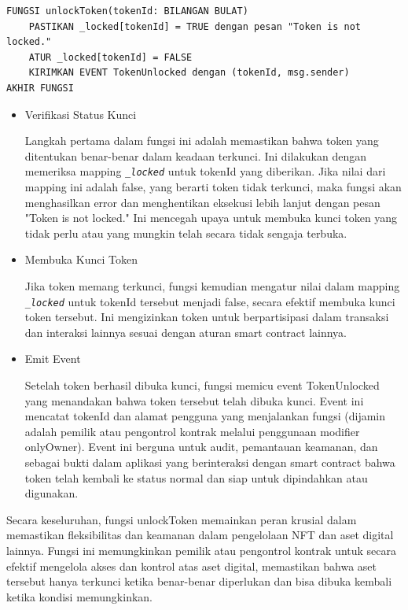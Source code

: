 \begin{lstlisting}[caption=Fungsi unlockToken]
FUNGSI unlockToken(tokenId: BILANGAN BULAT)
    PASTIKAN _locked[tokenId] = TRUE dengan pesan "Token is not locked."
    ATUR _locked[tokenId] = FALSE
    KIRIMKAN EVENT TokenUnlocked dengan (tokenId, msg.sender)
AKHIR FUNGSI
\end{lstlisting}

\begin{itemize}
    \item Verifikasi Status Kunci
    
    Langkah pertama dalam fungsi ini adalah memastikan bahwa token yang ditentukan benar-benar dalam keadaan terkunci. Ini dilakukan dengan memeriksa mapping \emph{\texttt{\_locked}} untuk tokenId yang diberikan. Jika nilai dari mapping ini adalah false, yang berarti token tidak terkunci, maka fungsi akan menghasilkan error dan menghentikan eksekusi lebih lanjut dengan pesan "Token is not locked." Ini mencegah upaya untuk membuka kunci token yang tidak perlu atau yang mungkin telah secara tidak sengaja terbuka.

    \item Membuka Kunci Token
    
    Jika token memang terkunci, fungsi kemudian mengatur nilai dalam mapping \emph{\texttt{\_locked}} untuk tokenId tersebut menjadi false, secara efektif membuka kunci token tersebut. Ini mengizinkan token untuk berpartisipasi dalam transaksi dan interaksi lainnya sesuai dengan aturan smart contract lainnya.

    \item Emit Event
    
    Setelah token berhasil dibuka kunci, fungsi memicu event TokenUnlocked yang menandakan bahwa token tersebut telah dibuka kunci. Event ini mencatat tokenId dan alamat pengguna yang menjalankan fungsi (dijamin adalah pemilik atau pengontrol kontrak melalui penggunaan modifier onlyOwner). Event ini berguna untuk audit, pemantauan keamanan, dan sebagai bukti dalam aplikasi yang berinteraksi dengan smart contract bahwa token telah kembali ke status normal dan siap untuk dipindahkan atau digunakan.
\end{itemize}

Secara keseluruhan, fungsi unlockToken memainkan peran krusial dalam memastikan fleksibilitas dan keamanan dalam pengelolaan NFT dan aset digital lainnya. Fungsi ini memungkinkan pemilik atau pengontrol kontrak untuk secara efektif mengelola akses dan kontrol atas aset digital, memastikan bahwa aset tersebut hanya terkunci ketika benar-benar diperlukan dan bisa dibuka kembali ketika kondisi memungkinkan.

